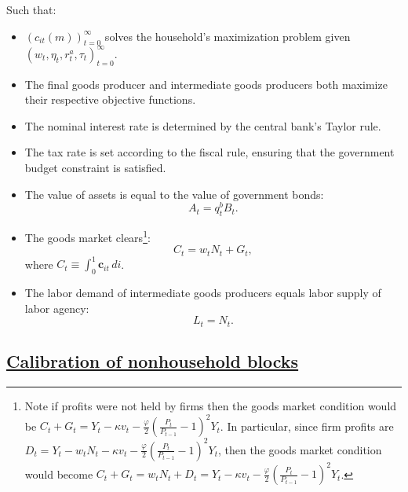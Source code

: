 \documentclass[qe,draft]{econsocart}
\theoremstyle{plain}
\theoremstyle{definition}
\begin{document}
Such that:
\begin{itemize}[label=--]
  \item
        ${\left(c_{it}(m)\right)}_{t=0}^{\infty}$  solves the household's maximization problem given ${\left( w_{t}, \eta_{t},  r^{a}_{t} , \tau_{t} \right)}_{t=0}^{\infty}$.
  \item
        The final goods producer and intermediate goods producers both maximize their respective objective functions.
  \item
        The nominal interest rate is determined by the central bank's Taylor rule.
  \item
        The tax rate is set according to the fiscal rule, ensuring that the government budget constraint is satisfied.
  \item
        The value of assets is equal to the value of government bonds:
        \[
          A_t =  q^{b}_{t}B_{t}.
        \]
  \item
        The goods market clears\footnote{Note if profits were not held by firms then the goods market condition would be $ C_{t}  + G_{t}  = Y_{t} -  \kappa v_{t} - \frac{\varphi}{2}{\left( \frac{P_{t}}{P_{t-1}} - 1\right)}^{2} Y_{t}  $.  In particular, since firm profits are $D_{t} = Y_{t} -  w_{t} N_{t}  - \kappa v_{t} - \frac{\varphi}{2}{\left( \frac{P_{t}}{P_{t-1}} - 1\right)}^{2} Y_{t} $, then the goods market condition would become $ C_{t}  + G_{t}  =w_{t} N_{t}  + D_{t} = Y_{t} -  \kappa v_{t} - \frac{\varphi}{2}{\left( \frac{P_{t}}{P_{t-1}} - 1\right)}^{2} Y_{t}  $. }:
        \[
          C_{t}  = w_{t} N_{t}  + G_{t},
        \]
        where $C_{t} \equiv  \int_{0}^{1} \textbf{c}_{it} \, di$.
  \item
        The labor demand of intermediate goods producers equals labor supply of labor agency:
        \[
          L_{t} =  N_{t}.
        \]
\end{itemize}

\begin{table}
  \begin{center}
    \renewcommand{\arraystretch}{1.6}
    \caption{Calibration}\label{table:Calibration} %
  \end{center}
\end{table}

\subsection{\href{https://econ-ark.github.io/HAFiscal/\#sec:hank-calibration}{Calibration of nonhousehold blocks }}\label{sec:hank-calibration}
\end{document}
